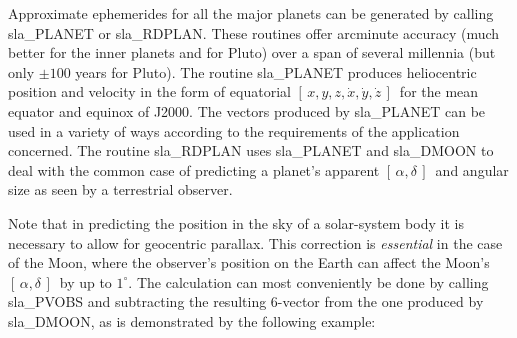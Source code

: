 \documentclass[11pt,twoside]{article}
\newcommand{\radec}     {$[\,\alpha,\delta\,]$}
\newcommand{\xyzxyzd}   {$[\,x,y,z,\dot{x},\dot{y},\dot{z}\,]$}
\begin{document}
Approximate ephemerides for all the major planets
can be generated by calling
sla\_PLANET
or
sla\_RDPLAN.  These routines offer arcminute accuracy (much
better for the inner planets and for Pluto) over a span of several
millennia (but only $\pm100$ years for Pluto).
The routine
sla\_PLANET produces heliocentric position and
velocity in the form of equatorial \xyzxyzd\ for the
mean equator and equinox of J2000.  The vectors
produced by
sla\_PLANET
can be used in a variety of ways according to the
requirements of the application concerned.  The routine
sla\_RDPLAN
uses
sla\_PLANET
and
sla\_DMOON
to deal with the common case of predicting
a planet's apparent \radec\ and angular size as seen by a
terrestrial observer.

Note that in predicting the position in the sky of a solar-system body
it is necessary to allow for geocentric parallax.  This correction
is {\it essential}\/ in the case of the Moon, where the observer's
position on the Earth can affect the Moon's \radec\ by up to
$1^\circ$.  The calculation can most conveniently be done by calling
sla\_PVOBS and subtracting the resulting 6-vector from the
one produced by
sla\_DMOON, as is demonstrated by the following example:
\goodbreak
\end{document}
